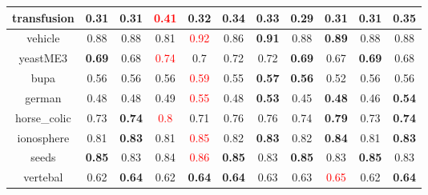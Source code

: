 \documentclass{article}%
\begin{document}
\begin{tabular}{c|cccccccccc}
\hline%
transfusion&0.31&0.31&\textcolor{red}{ 
0.41
}&0.32&\textbf{0.34}&0.33&0.29&\textbf{0.31}&0.31&\textbf{0.35}\\%
\hline%
vehicle&0.88&0.88&0.81&\textcolor{red}{ 
0.92
}&0.86&\textbf{0.91}&0.88&\textbf{0.89}&0.88&0.88\\%
\hline%
yeastME3&\textbf{0.69}&0.68&\textcolor{red}{ 
0.74
}&0.7&0.72&0.72&\textbf{0.69}&0.67&\textbf{0.69}&0.68\\%
\hline%
bupa&0.56&0.56&0.56&\textcolor{red}{ 
0.59
}&0.55&\textbf{0.57}&\textbf{0.56}&0.52&0.56&0.56\\%
\hline%
german&0.48&0.48&0.49&\textcolor{red}{ 
0.55
}&0.48&\textbf{0.53}&0.45&\textbf{0.48}&0.46&\textbf{0.54}\\%
\hline%
horse\_colic&0.73&\textbf{0.74}&\textcolor{red}{ 
0.8
}&0.71&0.76&0.76&0.74&\textbf{0.79}&0.73&\textbf{0.74}\\%
\hline%
ionosphere&0.81&\textbf{0.83}&0.81&\textcolor{red}{ 
0.85
}&0.82&\textbf{0.83}&0.82&\textbf{0.84}&0.81&\textbf{0.83}\\%
\hline%
seeds&\textbf{0.85}&0.83&0.84&\textcolor{red}{ 
0.86
}&\textbf{0.85}&0.83&\textbf{0.85}&0.83&\textbf{0.85}&0.83\\%
\hline%
vertebal&0.62&\textbf{0.64}&0.62&\textbf{0.64}&\textbf{0.64}&0.63&0.63&\textcolor{red}{ 
0.65
}&0.62&\textbf{0.64}\\%
\hline%
\end{tabular}

%
\end{document}
